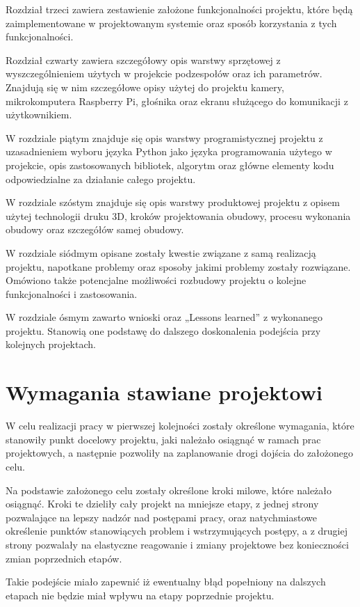 \documentclass[a4paper,12pt,reqno]{article}
\begin{document}
Rozdział trzeci zawiera zestawienie założone funkcjonalności projektu, które będą zaimplementowane w projektowanym systemie oraz sposób korzystania z tych funkcjonalności.

Rozdział czwarty zawiera szczegółowy opis warstwy sprzętowej z wyszczególnieniem użytych w projekcie podzespołów oraz ich parametrów. Znajdują się w nim szczegółowe opisy użytej do projektu kamery, mikrokomputera Raspberry Pi, głośnika oraz ekranu służącego do komunikacji z użytkownikiem.

W rozdziale piątym znajduje się opis warstwy programistycznej projektu z uzasadnieniem wyboru języka Python jako języka programowania użytego w projekcie, opis zastosowanych bibliotek, algorytm oraz główne elementy kodu odpowiedzialne za działanie całego projektu.

W rozdziale szóstym znajduje się opis warstwy produktowej projektu z opisem użytej technologii druku 3D, kroków projektowania obudowy, procesu wykonania obudowy oraz szczegółów samej obudowy.

W rozdziale siódmym opisane zostały kwestie związane z samą realizacją projektu, napotkane problemy oraz sposoby jakimi problemy zostały rozwiązane. Omówiono także potencjalne możliwości rozbudowy projektu o kolejne funkcjonalności i zastosowania.

W rozdziale ósmym zawarto wnioski oraz „Lessons learned” z wykonanego projektu. Stanowią one podstawę do dalszego doskonalenia podejścia przy kolejnych projektach.

\newpage
\section{Wymagania stawiane projektowi} \label{section:wymagania}

W celu realizacji pracy w pierwszej kolejności zostały określone wymagania, które stanowiły punkt docelowy projektu, jaki należało osiągnąć w ramach prac projektowych, a następnie pozwoliły na zaplanowanie drogi dojścia do założonego celu.

Na podstawie założonego celu zostały określone kroki milowe, które należało osiągnąć. Kroki te dzieliły cały projekt na mniejsze etapy, z jednej strony pozwalające na lepszy nadzór nad postępami pracy, oraz natychmiastowe określenie punktów stanowiących problem i wstrzymujących postępy, a z drugiej strony pozwalały na elastyczne reagowanie i zmiany projektowe bez konieczności zmian poprzednich etapów.

Takie podejście miało zapewnić iż ewentualny błąd popełniony na dalszych etapach nie będzie miał wpływu na etapy poprzednie projektu.
\end{document}
